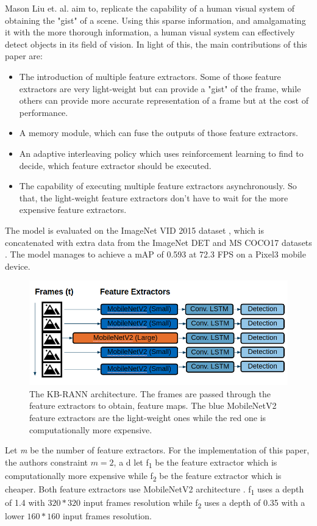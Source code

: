 \documentclass[conference]{IEEEtran}
\begin{document}
Mason Liu et. al. aim to, replicate the capability of a human visual system of obtaining the "gist" of a scene. Using this sparse information, and amalgamating it with the more thorough information, a human visual system can effectively detect objects in its field of vision. In light of this, the main contributions of this paper are:
\begin{itemize}
	\item The introduction of multiple feature extractors. Some of those feature extractors are very light-weight but can provide a "gist" of the frame, while others can provide more accurate representation of a frame but at the cost of performance.
	\item A memory module, which can fuse the outputs of those feature extractors.
	\item An adaptive interleaving policy which uses reinforcement learning to find to decide, which feature extractor should be executed.
	\item The capability of executing multiple feature extractors asynchronously. So that, the light-weight feature extractors don't have to wait for the more expensive feature extractors.
\end{itemize}
The model is evaluated on the ImageNet VID 2015 dataset \cite{b35}, which is concatenated with extra data from the ImageNet DET \cite{b35} and MS COCO17 datasets \cite{b31}. The model manages to achieve a mAP of 0.593 at 72.3 FPS on a Pixel3 mobile device. \newline

\begin{figure}[h]
\includegraphics[width=\columnwidth]{looking-fast-and-slow-architecture}
\caption{The KB-RANN architecture. The frames are passed through the feature extractors to obtain, feature maps. The blue MobileNetV2 feature extractors are the light-weight ones while the red one is computationally more expensive.}
\end{figure}

Let \textit{m} be the number of feature extractors. For the implementation of this paper, the authors constraint $\textit{m}=2$, a d let f\textsubscript{1} be the feature extractor which is computationally more expensive while f\textsubscript{2} be the feature extractor which is cheaper. Both feature extractors use MobileNetV2 architecture \cite{b36}. f\textsubscript{1} uses a depth of 1.4 with $320*320$ input frames resolution while f\textsubscript{2} uses a depth of 0.35 with a lower $160*160$ input frames resolution. \newline
\end{document}
